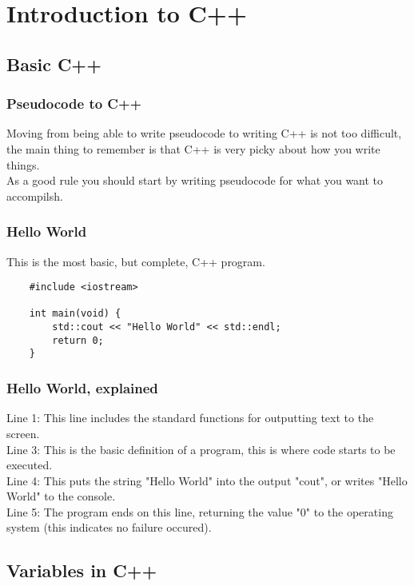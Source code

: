 \documentclass{beamer}
\begin{document}
\section{Introduction to C++}

\subsection{Basic C++}

\begin{frame}
	\frametitle{Pseudocode to C++}
	Moving from being able to write pseudocode to writing C++ is not too
	difficult, the main thing to remember is that C++ is very picky about
	how you write things.\\
	As a good rule you should start by writing pseudocode for what you want
	to accompilsh.
\end{frame}

\begin{frame}[fragile]
	\frametitle{Hello World}
	This is the most basic, but complete, C++ program.
	\begin{lstlisting}
	#include <iostream>

	int main(void) {
	    std::cout << "Hello World" << std::endl;
	    return 0;
	}
	\end{lstlisting}
\end{frame}

\begin{frame}[fragile]
	\frametitle{Hello World, explained}
	Line 1: This line includes the standard functions for outputting text to the screen. \\
	Line 3: This is the basic definition of a program, this is where code starts to be executed. \\
	Line 4: This puts the string "Hello World" into the output "cout", or writes "Hello World" to the console. \\
	Line 5: The program ends on this line, returning the value "0" to the operating system (this indicates no failure occured). 
\end{frame}

\subsection{Variables in C++}
\end{document}
